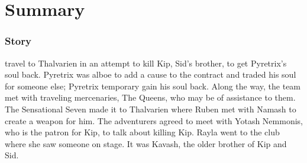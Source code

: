 \part*{Summary}
\section{Story}
 travel to Thalvarien in an attempt to kill Kip, Sid's brother, to get Pyretrix's soul back.
Pyretrix was alboe to add a cause to the contract and traded his soul for someone else; Pyretrix temporary gain his soul back.
Along the way, the team met with traveling mercenaries, The Queens, who may be of assistance to them.
The Sensational Seven made it to Thalvarien where Ruben met with Namash to create a weapon for him.
The adventurers agreed to meet with Yotash Nemmonis, who is the patron for Kip, to talk about killing Kip.
Rayla went to the club where she saw someone on stage. It was Kavash, the older brother of Kip and Sid.
